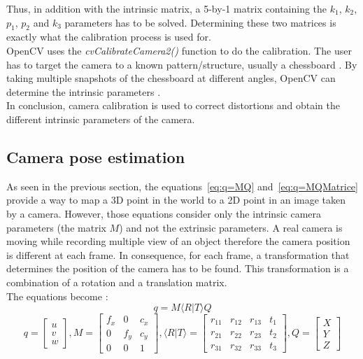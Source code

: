 Thus, in addition with the intrinsic matrix, a 5-by-1 matrix containing the $k_1$, $k_2$, $p_1$, $p_2$ and $k_3$ parameters has to be solved. Determining these two matrices is exactly what the calibration process is used for. \\

OpenCV uses the \textit{cvCalibrateCamera2()} function to do the calibration. The user has to target the camera to a known pattern/structure, usually a chessboard \cite{zhang_flexible_1999}. By taking multiple snapshots of the chessboard at different angles, OpenCV can determine the intrinsic parameters \cite{camera}. \\

In conclusion, camera calibration is used to correct distortions and obtain the different intrinsic parameters of the camera.

\subsection{Camera pose estimation}
\label{sec:Camera pose estimation}

As seen in the previous section, the equations~\ref{eq:q=MQ} and~\ref{eq:q=MQMatrice} provide a way to map a 3D point in the world to a 2D point in an image taken by a camera. However, those equations consider only the intrinsic camera parameters (the matrix $M$) and not the extrinsic parameters. A real camera is moving while recording multiple view of an object therefore the camera position is different at each frame. In consequence, for each frame, a transformation that determines the position of the camera has to be found. This transformation is a combination of a rotation and a translation matrix. \\

The equations become \cite{camera1}: 
\begin{equation}
  q = M\langle R\vert T\rangle Q     
\end{equation}
\begin{equation}
  q = \begin{bmatrix}
       u \\
       v \\
       w 
     \end{bmatrix}, 
  M = \begin{bmatrix}
       f_x & 0 & c_x \\
       0 & f_y & c_y \\
       0 & 0 & 1
     \end{bmatrix}, 
  \langle R\vert T\rangle =  \begin{bmatrix}
       r_{11} & r_{12} & r_{13} & t_1 \\
       r_{21} & r_{22} & r_{23} & t_2\\
       r_{31} & r_{32} & r_{33} & t_3
     \end{bmatrix},  
  Q = \begin{bmatrix}
       X \\
       Y \\
       Z 
     \end{bmatrix}     
\end{equation}

